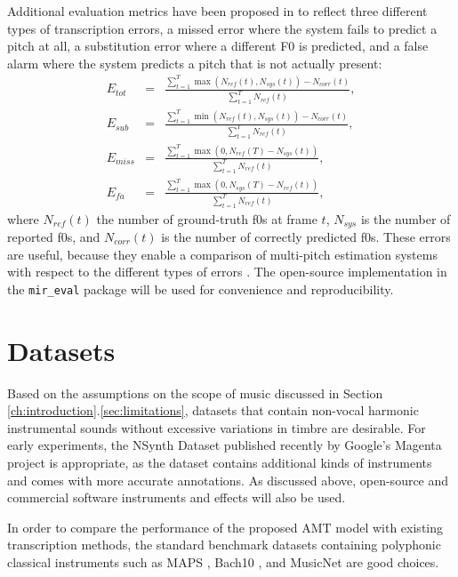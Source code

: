 Additional evaluation metrics have been proposed in \cite{poliner2007discriminative} to reflect three different types of transcription errors, a missed error where the system fails to predict a pitch at all, a substitution error where a different F0 is predicted, and a false alarm where the system predicts a pitch that is not actually present:
\begin{eqnarray}
E_{tot} & = & \frac{\sum_{t=1}^T \max ( N_{ref}(t), N_{sys}(t) ) - N_{corr}(t)}{\sum_{t=1}^T N_{ref}(t)}, \\
E_{sub} & = & \frac{\sum_{t=1}^T \min ( N_{ref}(t), N_{sys}(t) ) - N_{corr}(t)}{\sum_{t=1}^T N_{ref}(t)}, \\
E_{miss} & = & \frac{\sum_{t=1}^T \max ( 0, N_{ref}(T) - N_{sys}(t) )}{\sum_{t=1}^T N_{ref}(t)}, \\
E_{fa} & = &  \frac{\sum_{t=1}^T \max ( 0, N_{sys}(T) - N_{ref}(t) )}{\sum_{t=1}^T N_{ref}(t)},
\end{eqnarray}
where $N_{ref}(t)$ the number of ground-truth f0s at frame $t$, $N_{sys}$ is the number of reported f0s, and $N_{corr}(t)$ is the number of correctly predicted f0s.
These errors are useful, because they enable a comparison of multi-pitch estimation systems with respect to the different types of errors \cite{bay2009evaluation}.
The open-source implementation in the \texttt{mir\_eval} package \cite{raffel2014mir_eval} will be used for convenience and reproducibility.

\section{Datasets}

Based on the assumptions on the scope of music discussed in Section \ref{ch:introduction}.\ref{sec:limitations}, datasets that contain non-vocal harmonic instrumental sounds without excessive variations in timbre are desirable.
For early experiments, the NSynth Dataset published recently by Google's Magenta project \cite{engel2017nsynth} is appropriate, as the dataset contains additional kinds of instruments and comes with more accurate annotations.
As discussed above, open-source and commercial software instruments and effects will also be used.

In order to compare the performance of the proposed AMT model with existing transcription methods, the standard benchmark datasets containing polyphonic classical instruments such as MAPS \cite{emiya2010smoothness}, Bach10 \cite{duan2010bach10}, and MusicNet \cite{thickstun2017musicnet} are good choices.
